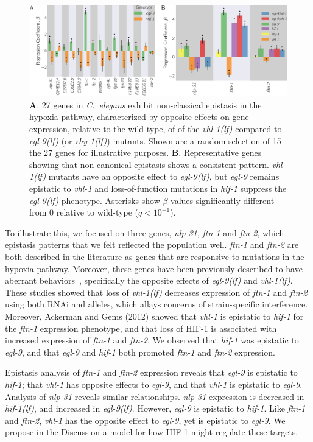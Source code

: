 \documentclass[10pt, onecolumn]{article}
\newcommand{\qval}[1]{$q<10^{-#1}$}
\newcommand{\cel}{\emph{C.~elegans}}
\newcommand{\gene}[1]{\emph{#1}}
\newcommand{\nlp}{\emph{\mbox{nlp-31}}}
\newcommand{\ftna}{\emph{\mbox{ftn-1}}}
\newcommand{\ftnb}{\emph{\mbox{ftn-2}}}
\newcommand{\egl}{\emph{\mbox{egl-9}(lf)}}
\newcommand{\rhy}{\emph{\mbox{rhy-1}(lf)}}
\newcommand{\vhl}{\emph{\mbox{vhl-1}(lf)}}
\newcommand{\hif}{\emph{\mbox{hif-1(lf)}}}
\newcommand{\hifp}{HIF-1}
\begin{document}
\begin{figure}[tbhp]
\centering
\includegraphics[width=.9\linewidth]{../figs/hif1oh-epistasis-horizontal.pdf}
\caption{
\textbf{A}. 27 genes in \cel{} exhibit non-classical epistasis in the hypoxia
pathway, characterized by opposite effects on gene expression, relative to the
wild-type, of of the \vhl{} compared to \egl{} (or
\rhy{}) mutants. Shown are a random selection of 15 the 27 genes for illustrative
purposes.
\textbf{B}. Representative genes showing that non-canonical epistasis shows a
consistent pattern. \vhl{} mutants have an opposite effect to \egl{}, but
\gene{egl-9} remains epistatic to \gene{vhl-1} and loss-of-function mutations in
\gene{hif-1} suppress the \egl{} phenotype. Asterisks show $\beta$ values
significantly different from 0 relative to wild-type (\qval{1}).
}
\label{fig:hif1oh}
\end{figure}

To illustrate this, we focused on three genes, \nlp{}, \ftna{} and \ftnb{}, which
epistasis patterns that we felt reflected the population well. \ftna{} and \ftnb{}
are both described in the literature as genes that are responsive to mutations in
the hypoxia pathway. Moreover, these genes have been previously described to have
aberrant behaviors~\cite{Ackerman2012,Romney2011}, specifically the
opposite effects of \egl{} and \vhl{}. These studies showed that loss of \vhl{}
decreases expression of \ftna{} and \ftnb{} using both RNAi and alleles, which
allays concerns of strain-specific interference. Moreover, Ackerman and Gems (2012)
showed that \gene{vhl-1} is epistatic to \gene{hif-1} for the \ftna{}
expression phenotype, and that loss of
\hifp{} is associated with increased expression of \ftna{} and \ftnb{}. We observed
that \gene{hif-1} was epistatic to \gene{egl-9}, and that \gene{egl-9} and
\gene{hif-1} both promoted \ftna{} and \ftnb{} expression.

Epistasis analysis of \ftna{} and \ftnb{} expression reveals that \gene{egl-9} is
epistatic to \gene{hif-1}; that \gene{vhl-1} has opposite effects to \gene{egl-9},
and that \gene{vhl-1} is epistatic to \gene{egl-9}. Analysis of \nlp{}
reveals similar relationships. \nlp{} expression is decreased in \hif{},
and increased in \egl{}. However, \gene{egl-9} is epistatic to \gene{hif-1}.
Like \ftna{} and \ftnb{}, \gene{vhl-1} has the opposite effect to \gene{egl-9},
yet is epistatic to \gene{egl-9}. We propose in the Discussion a model for how
\hifp{} might regulate these targets.
\end{document}
